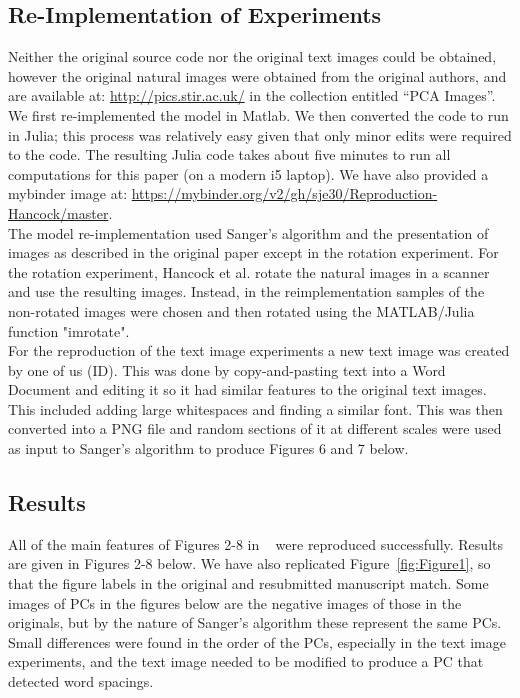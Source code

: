 \subsection{Re-Implementation of Experiments}

Neither the original source code nor the original text images could be obtained, however the original natural images were obtained from the original authors, and are available at: \url{http://pics.stir.ac.uk/} in the collection entitled
``PCA Images''. We first re-implemented the model in Matlab.  We then converted the code to
run in Julia; this process was relatively easy given that only minor
edits were required to the code.  The resulting Julia code takes about
five minutes to run all computations for this paper (on a modern i5
laptop).  We have also provided a mybinder image at:
\url{https://mybinder.org/v2/gh/sje30/Reproduction-Hancock/master}.\\
The model re-implementation used Sanger's algorithm and the presentation of images as described in the original paper except in the rotation experiment. For the rotation experiment, Hancock et al. rotate the natural images in a scanner and use the resulting images. Instead, in the reimplementation samples of the non-rotated images were chosen and then rotated using the MATLAB/Julia function "imrotate".\\
For the reproduction of the text image experiments a new text image was created by one of us (ID). This was done by copy-and-pasting text into a Word Document and editing it so it had similar features to the original text images. This included adding large whitespaces and finding a similar font. This was then converted into a PNG file and random sections of it at different scales were used as input to Sanger's algorithm to produce Figures 6 and 7 below. 

\subsection{Results}
All of the main features of Figures 2-8 in ~\cite{Hancock1992-mp} were reproduced successfully. Results are given in Figures 2-8 below. We have also replicated Figure~\ref{fig:Figure1}, so that the figure labels in the original and resubmitted manuscript match.  Some images of PCs in the figures below are the negative images of those in the originals, but by the nature of Sanger's algorithm these represent the same PCs. Small differences were found in the order of the PCs, especially in the text image experiments, and the text image needed to be modified to produce a PC that detected word spacings.



